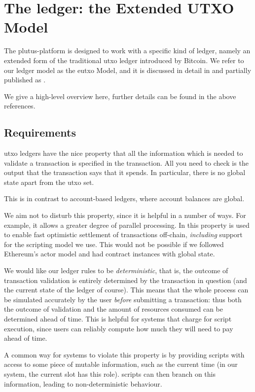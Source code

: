 \section{The ledger: the Extended UTXO Model}
\label{sec:ledger}

The \gls{plutus-platform} is designed to work with a specific kind of ledger, namely an extended form of the traditional \gls{utxo} ledger introduced by Bitcoin.
We refer to our ledger model as the \gls{eutxo} Model, and it is discussed in detail in \textcite{eutxo} and partially published as \textcite{chakravarty2020extended}.

We give a high-level overview here, further details can be found in the above references.

\subsection{Requirements}
\begin{requirement}[Locality]
\label{req:ledger-locality}
\Gls{utxo} ledgers have the nice property that all the information which is needed to validate a transaction is specified in the transaction.
All you need to check is the output that the transaction says that it spends.
In particular, there is no global state apart from the \gls{utxo} set.

This is in contrast to account-based ledgers, where account balances are global.

We aim not to disturb this property, since it is helpful in a number of ways.
For example, it allows a greater degree of parallel processing.
In \textcite{chakravartyhydra} this property is used to enable fast optimistic settlement of transactions off-chain, \emph{including} support for the scripting model we use.
This would not be possible if we followed Ethereum's actor model and had contract instances with global state.
\end{requirement}

\begin{requirement}[Determinism]
\label{req:ledger-determinism}
We would like our ledger rules to be \emph{deterministic}, that is, the outcome of transaction validation is entirely determined by the transaction in question (and the current state of the ledger of course).
This means that the whole process can be simulated accurately by the user \emph{before} submitting a transaction: thus both the outcome of validation and the amount of resources consumed can be determined ahead of time.
This is helpful for systems that charge for \gls{script} execution, since users can reliably compute how much they will need to pay ahead of time.

A common way for systems to violate this property is by providing \glspl{script} with access to some piece of mutable information, such as the current time (in our system, the current slot has this role).
\Glspl{script} can then branch on this information, leading to non-deterministic behaviour.
\end{requirement}

